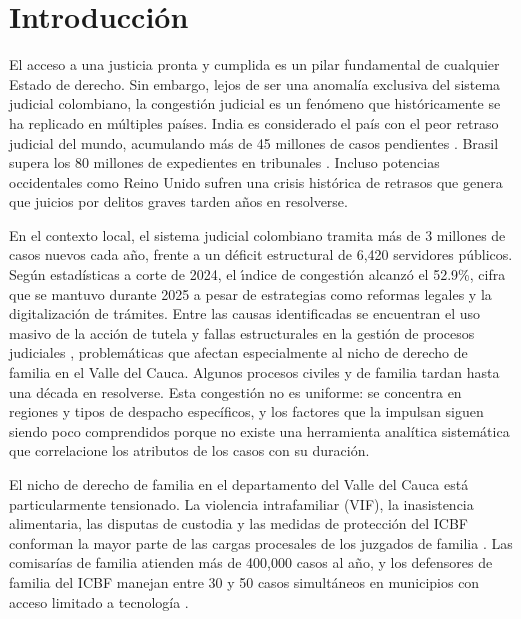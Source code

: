 \documentclass[runningheads]{llncs}
\begin{document}
\section{Introducci\'{o}n}

El acceso a una justicia pronta y cumplida es un pilar fundamental de cualquier Estado de derecho. Sin embargo, lejos de ser una anomal\'{i}a exclusiva del sistema judicial colombiano, la congesti\'{o}n judicial es un fen\'{o}meno que hist\'{o}ricamente se ha replicado en m\'{u}ltiples pa\'{i}ses. India es considerado el pa\'{i}s con el peor retraso judicial del mundo, acumulando m\'{a}s de 45 millones de casos pendientes \cite{shamsan2026predictive}. Brasil supera los 80 millones de expedientes en tribunales \cite{deoliveira2022predicting}. Incluso potencias occidentales como Reino Unido sufren una crisis hist\'{o}rica de retrasos que genera que juicios por delitos graves tarden a\~{n}os en resolverse.

En el contexto local, el sistema judicial colombiano tramita m\'{a}s de 3 millones de casos nuevos cada a\~{n}o, frente a un d\'{e}ficit estructural de 6,420 servidores p\'{u}blicos. Seg\'{u}n estad\'{i}sticas a corte de 2024, el \'{\i}ndice de congesti\'{o}n alcanz\'{o} el 52.9\%, cifra que se mantuvo durante 2025 a pesar de estrategias como reformas legales y la digitalizaci\'{o}n de tr\'{a}mites. Entre las causas identificadas se encuentran el uso masivo de la acci\'{o}n de tutela y fallas estructurales en la gesti\'{o}n de procesos judiciales \cite{csj2023}, problem\'{a}ticas que afectan especialmente al nicho de derecho de familia en el Valle del Cauca. Algunos procesos civiles y de familia tardan hasta una d\'{e}cada en resolverse. Esta congesti\'{o}n no es uniforme: se concentra en regiones y tipos de despacho espec\'{i}ficos, y los factores que la impulsan siguen siendo poco comprendidos porque no existe una herramienta anal\'{i}tica sistem\'{a}tica que correlacione los atributos de los casos con su duraci\'{o}n.

El nicho de derecho de familia en el departamento del Valle del Cauca est\'{a} particularmente tensionado. La violencia intrafamiliar (VIF), la inasistencia alimentaria, las disputas de custodia y las medidas de protecci\'{o}n del ICBF conforman la mayor parte de las cargas procesales de los juzgados de familia \cite{icbf2023}. Las comisar\'{i}as de familia atienden m\'{a}s de 400,000 casos al a\~{n}o, y los defensores de familia del ICBF manejan entre 30 y 50 casos simult\'{a}neos en municipios con acceso limitado a tecnolog\'{i}a \cite{ley2126}.
\end{document}
